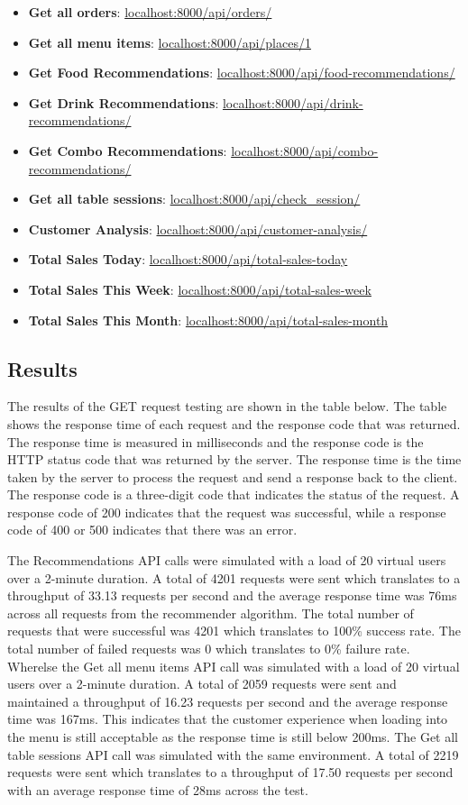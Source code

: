     \begin{itemize}
        \item \textbf{Get all orders}: \url{localhost:8000/api/orders/}
        \item \textbf{Get all menu items}: \url{localhost:8000/api/places/1}
        \item \textbf{Get Food Recommendations}: \url{localhost:8000/api/food-recommendations/}
        \item \textbf{Get Drink Recommendations}: \url{localhost:8000/api/drink-recommendations/}
        \item \textbf{Get Combo Recommendations}: \url{localhost:8000/api/combo-recommendations/}
        \item \textbf{Get all table sessions}: \url{localhost:8000/api/check_session/}
        \item \textbf{Customer Analysis}: \url{localhost:8000/api/customer-analysis/}
        \item \textbf{Total Sales Today}: \url{localhost:8000/api/total-sales-today}
        \item \textbf{Total Sales This Week}: \url{localhost:8000/api/total-sales-week}
        \item \textbf{Total Sales This Month}: \url{localhost:8000/api/total-sales-month}
    \end{itemize}

\subsection*{Results}
The results of the GET request testing are shown in the table below. The table shows the response time of each request and the response code that was returned. The response time is measured in milliseconds and the response code is the HTTP status code that was returned by the server. The response time is the time taken by the server to process the request and send a response back to the client. The response code is a three-digit code that indicates the status of the request. A response code of 200 indicates that the request was successful, while a response code of 400 or 500 indicates that there was an error.

The Recommendations API calls were simulated with a load of 20 virtual users over a 2-minute duration. A total of 4201 requests were sent which translates to a throughput of 33.13 requests per second and the average response time was 76ms across all requests from the recommender algorithm. The total number of requests that were successful was 4201 which translates to 100\% success rate. The total number of failed requests was 0 which translates to 0\% failure rate. Wherelse the Get all menu items API call was simulated with a load of 20 virtual users over a 2-minute duration. A total of 2059 requests were sent and maintained a throughput of 16.23 requests per second and the average response time was 167ms. This indicates that the customer experience when loading into the menu is still acceptable as the response time is still below 200ms. The Get all table sessions API call was simulated with the same environment. A total of 2219 requests were sent which translates to a throughput of 17.50 requests per second with an average response time of 28ms across the test.

